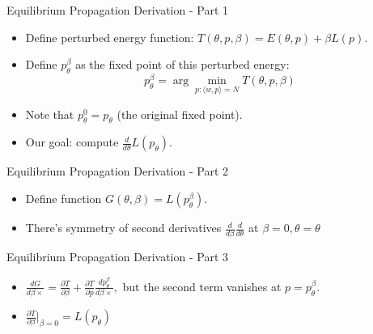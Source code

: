 \documentclass{beamer}
\begin{document}
\begin{frame}{Equilibrium Propagation Derivation - Part 1}
  \begin{itemize}
    \item Define perturbed energy function: $T(\theta,p,\beta)=E(\theta,p)+\beta L(p)$.
    \item Define $p_{\theta}^{\beta}$ as the fixed point of this perturbed energy:
    \[
      p_{\theta}^{\beta} = \arg\min_{p:\langle w,p \rangle = N} T(\theta, p, \beta)
    \]
    \item Note that $p_{\theta}^{0} = p_{\theta}$ (the original fixed point).
    \item Our goal: compute $\frac{d}{d\theta}L(p_{\theta})$.
  \end{itemize}
\end{frame}

\begin{frame}{Equilibrium Propagation Derivation - Part 2}
  \begin{itemize}
    \item Define function $G(\theta,\beta) = L(p_{\theta}^{\beta})$.
    \item There's symmetry of second derivatives $\frac{d}{d\beta}\frac{d}{d\theta} $ at $\beta = 0, \theta = \theta$

  \end{itemize}
\end{frame}

\begin{frame}{Equilibrium Propagation Derivation - Part 3}
  \begin{itemize}
    \item $\frac{dG}{d\beta×} = \frac{\partial T}{\partial \beta} + \frac{\partial T}{\partial p} \frac{d p_\theta^\beta}{d\beta×},$ but the second term vanishes at $p = p_\theta^\beta$.
    \item $ \frac{\partial T}{\partial \beta}\big|_{\beta = 0} = L(p_\theta)$
  \end{itemize}
\end{frame}
\end{document}
